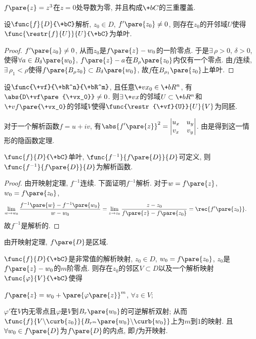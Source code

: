 \documentclass[../ComplexVariable.tex]{subfiles}
\begin{document}
\begin{sample}
    \begin{ex}
        $f\pare{z} = z^3$在$z=0$处导数为零, 并且构成$\+bC$的三重覆盖.
    \end{ex}
\end{sample}
\begin{corollary}
    设$\func{f}{D}{\+bC}$解析, $z_0 \in D$, $f'\pare{z_0}\neq 0$, 则存在$z_0$的开邻域$U$使得$\func{\restr{f}{U}}{U}{\+bC}$为单叶.
\end{corollary}
\begin{proof}
    $f'\pare{z_0}\neq 0$, 从而$z_0$是$f\pare{z} - w_0$的一阶零点. 于是$\exists\, \rho > 0$, $\delta > 0$, 使得$\forall a\in B_\delta\pare{w_0}$, $f\pare{z} - a$在$B_\rho\pare{z_0}$内仅有一个零点. 由$f$连续, $\exists\, \rho_1 < \rho$使得$f\pare{B_\rho{z_0}}\subset B_\delta\pare{w_0}$, 故$f$在$B_{\rho_1}\pare{z_0}$上单叶.
\end{proof}
\begin{remark}
    设$\func{\+vf}{\+bR^n}{\+bR^m}$, 且任意$\+vx_0\in\+bR^n$, 有$\abs{D\+vf\pare{\+vx_0}}\neq 0$. 则$\exists\, \+vx$的邻域$U\subset \+bR^n$和$\+vf\pare{\+vx_0}$的邻域$V$使得$\func{\restr{\+vf}{U}}{U}{V}$为同胚.
\end{remark}
\begin{remark}
    对于一个解析函数$f = u+iv$, 有$\displaystyle \abs{f'\pare{z}}^2 = \begin{vmatrix}
        u_x & u_y \\
        v_x & v_y
    \end{vmatrix}$. 由是得到这一情形的隐函数定理.
\end{remark}
\begin{corollary}
    $\func{f}{D}{\+bC}$单叶, $\func{f^{-1}}{f\pare{D}}{D}$可定义, 则$\func{f^{-1}}{f\pare{D}}{D}$为解析函数.
\end{corollary}
\begin{proof}
    由开映射定理, $f^{-1}$连续. 下面证明$f^{-1}$解析. 对于$w = f\pare{z}$, $w_0 = f\pare{z_0}$,
    \begin{align*}
        \lim_{w\rightarrow w_0} \frac{f^{-1}\pare{w} - f^{-1}\pare{w_0}}{w-w_0} &= \lim_{z\rightarrow z_0} \frac{z-z_0}{f\pare{z} - f\pare{z_0}} = \rec{f'\pare{z_0}}.
    \end{align*}
    故$f^{-1}$是解析的.
\end{proof}
\begin{remark}
    由开映射定理, $f\pare{D}$是区域.
\end{remark}
\begin{theorem}
    $\func{f}{D}{\+bC}$是非常值的解析映射, $z_0 \in D$, $w_0 = f\pare{z_0}$, $z_0$是$f\pare{z} - w_0$的$m$阶零点. 则存在$z_0$的邻区$V\subset D$以及一个解析映射$\func{\varphi}{V}{\+bC}$使得
    \begin{cenum}
        \item $f\pare{z} = w_0 + \pare{\varphi\pare{z}}^m$, $\forall z\in V$;
        \item $\varphi'$在$V$内无零点且$\varphi$是$V$到$B_r\pare{w_0}$的可逆解析双射; 从而$\func{f}{V\backslash \curb{z_0}}{B_{r^m}\pare{w_0}\backslash\curb{w_0}}$上为$m$到$1$的映射. 且$\forall w_0 \in f\pare{D}$为$f\pare{D}$的内点, 即$f$为开映射.
    \end{cenum}
\end{theorem}
\end{document}

